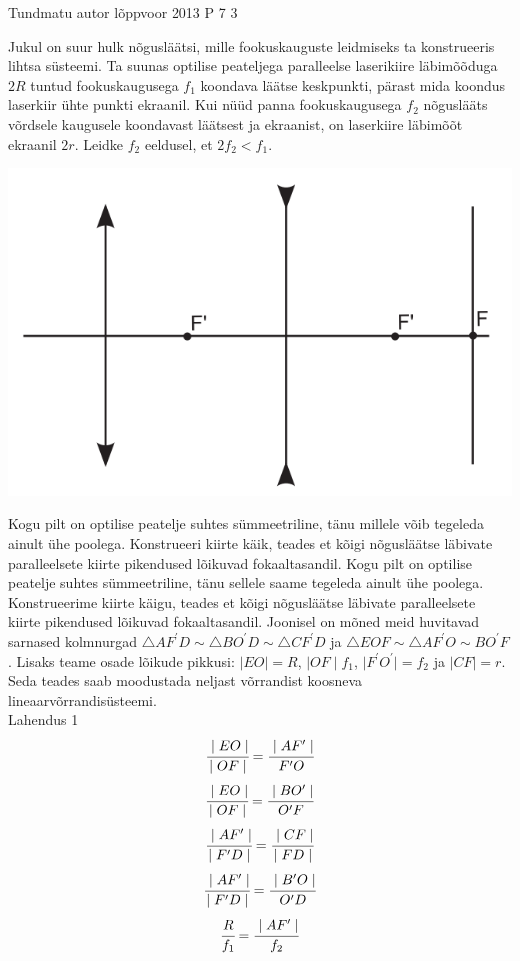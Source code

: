 {Tundmatu autor} %
{lõppvoor} %
{2013} %
{P 7} %
{3} %
{
\ifStatement
Jukul on suur hulk nõgusläätsi, mille fookuskauguste leidmiseks ta konstrueeris lihtsa
süsteemi. Ta suunas optilise peateljega paralleelse laserikiire läbimõõduga $2R$ tuntud
fookuskaugusega $f_1$ koondava läätse keskpunkti, pärast mida koondus laserkiir ühte punkti
ekraanil. Kui nüüd panna fookuskaugusega $f_2$ nõguslääts võrdsele kaugusele koondavast
läätsest ja ekraanist, on laserkiire läbimõõt ekraanil $2r$. Leidke $f_2$ eeldusel, et $2f_2 < f_1$.
\begin{center}
	\includegraphics[width=0.5\linewidth]{2013-v3p-07-yl.png}
\end{center}
\fi
\ifHint
Kogu pilt on optilise peatelje suhtes sümmeetriline, tänu millele võib tegeleda ainult ühe poolega. Konstrueeri kiirte käik, teades et kõigi nõgusläätse läbivate paralleelsete kiirte pikendused lõikuvad fokaaltasandil.
\fi
\ifSolution
Kogu pilt on optilise peatelje suhtes sümmeetriline, tänu sellele  saame tegeleda ainult ühe poolega. Konstrueerime kiirte käigu, teades et kõigi nõgusläätse läbivate paralleelsete kiirte pikendused lõikuvad fokaaltasandil.
Joonisel on mõned meid huvitavad sarnased kolmnurgad $\triangle AF^\prime D \sim \triangle BO ^\prime D \sim \triangle CF ^\prime D$ ja $\triangle EOF \sim \triangle AF ^\prime O \sim BO ^\prime F$. Lisaks teame osade lõikude pikkusi: $\mid EO \mid = R$, $\mid OF \mid f_1$, $\mid F ^\prime O ^\prime \mid = f_2$ ja $\mid CF \mid = r$. Seda teades saab moodustada neljast võrrandist koosneva lineaarvõrrandisüsteemi.
\\
Lahendus 1 \\
\[
\cfrac{\mid EO \mid}{\mid OF \mid} = \cfrac{\mid AF^\prime \mid}{F ^\prime O} 
\]
\[
\cfrac{\mid EO \mid}{\mid OF \mid} = \cfrac{\mid BO ^\prime \mid}{O ^\prime F}
\]
\[
\cfrac{\mid AF^\prime \mid}{\mid F^\prime D \mid} = \cfrac{\mid CF \mid}{\mid FD \mid}
\]
\[
\cfrac{\mid AF^\prime \mid}{\mid F^\prime D \mid} = \cfrac{\mid B^\prime O \mid}{O^\prime D} 
\]
\[
\cfrac{R}{f_1} = \cfrac{\mid AF^\prime \mid}{f_2} 
\]}
